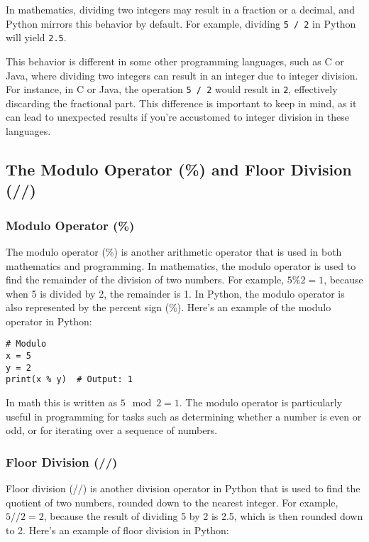 In mathematics, dividing two integers may result in a fraction or a decimal, and Python mirrors this behavior by default. For example, dividing \lstinline|5 / 2| in Python will yield \lstinline|2.5|.

This behavior is different in some other programming languages, such as C or Java, where dividing two integers can result in an integer due to integer division. For instance, in C or Java, the operation \lstinline|5 / 2| would result in \lstinline|2|, effectively discarding the fractional part. This difference is important to keep in mind, as it can lead to unexpected results if you're accustomed to integer division in these languages.

\subsection{The Modulo Operator (\%) and Floor Division (//)}

\subsubsection{Modulo Operator (\%)}
The modulo operator (\%) is another arithmetic operator that is used in both mathematics and programming. In mathematics, the modulo operator is used to find the remainder of the division of two numbers. For example, $5 \% 2 = 1$, because when 5 is divided by 2, the remainder is 1. In Python, the modulo operator is also represented by the percent sign (\%). Here's an example of the modulo operator in Python:

\begin{lstlisting}
# Modulo
x = 5
y = 2
print(x % y)  # Output: 1
\end{lstlisting}

In math this is written as $5 \mod 2 = 1$. The modulo operator is particularly useful in programming for tasks such as determining whether a number is even or odd, or for iterating over a sequence of numbers.

\subsubsection{Floor Division (//)}
Floor division (//) is another division operator in Python that is used to find the quotient of two numbers, rounded down to the nearest integer. For example, $5 // 2 = 2$, because the result of dividing 5 by 2 is 2.5, which is then rounded down to 2. Here's an example of floor division in Python:

